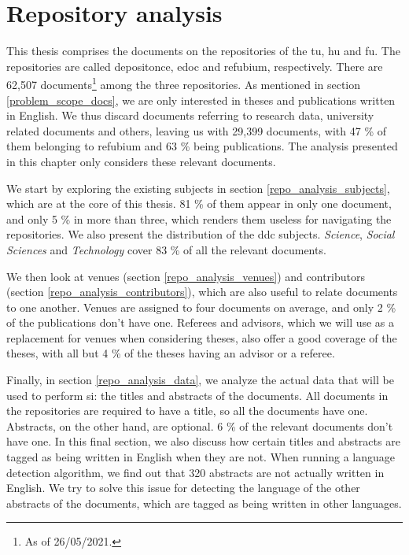 \section{Repository analysis} \label{repo_analysis}

This thesis comprises the documents on the repositories of the \acrshort{tu}, \acrshort{hu} and \acrshort{fu}. The repositories are called depositonce, edoc and refubium, respectively. There are 62,507 documents\footnote{As of 26/05/2021.} among the three repositories. As mentioned in section \ref{problem_scope_docs}, we are only interested in theses and publications written in English. We thus discard documents referring to research data, university related documents and others, leaving us with 29,399 documents, with 47 \% of them belonging to refubium and 63 \% being publications. The analysis presented in this chapter only considers these relevant documents.

We start by exploring the existing subjects in section \ref{repo_analysis_subjects}, which are at the core of this thesis. 81 \% of them appear in only one document, and only 5 \% in more than three, which renders them useless for navigating the repositories. We also present the distribution of the \acrfull{ddc} subjects. \textit{Science}, \textit{Social Sciences} and \textit{Technology} cover 83 \% of all the relevant documents.

We then look at venues (section \ref{repo_analysis_venues}) and contributors (section \ref{repo_analysis_contributors}), which are also useful to relate documents to one another. Venues are assigned to four documents on average, and only 2 \% of the publications don't have one. Referees and advisors, which we will use as a replacement for venues when considering theses, also offer a good coverage of the theses, with all but 4 \% of the theses having an advisor or a referee.

Finally, in section \ref{repo_analysis_data}, we analyze the actual data that will be used to perform \acrshort{si}: the titles and abstracts of the documents. All documents in the repositories are required to have a title, so all the documents have one. Abstracts, on the other hand, are optional. 6 \% of the relevant documents don't have one. In this final section, we also discuss how certain titles and abstracts are tagged as being written in English when they are not. When running a language detection algorithm, we find out that 320 abstracts are not actually written in English. We try to solve this issue for detecting the language of the other abstracts of the documents, which are tagged as being written in other languages.





